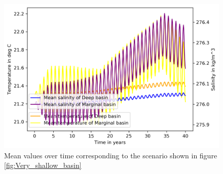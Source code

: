 \documentclass[twocolumn]{article}
\begin{document}
\begin{figure}
\centering
\includegraphics[width=\textwidth,keepaspectratio]{60m_mar_depth_40yr_totals.png}
\caption{Mean values over time corresponding to the scenario shown in figure \ref{fig:Very_shallow_basin}}
\label{fig:Very_shallow_basin_means}
\end{figure}\hfill
\end{document}
